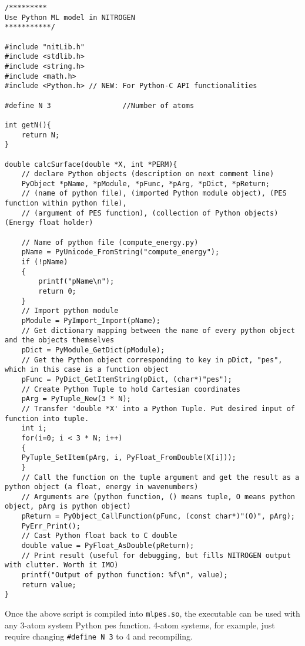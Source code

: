 \documentclass{article}
\begin{document}
\begin{lstlisting}[style=CStyle]
/*********
Use Python ML model in NITROGEN
***********/

#include "nitLib.h"
#include <stdlib.h>
#include <string.h>
#include <math.h>
#include <Python.h> // NEW: For Python-C API functionalities

#define N 3                 //Number of atoms

int getN(){
    return N;
}

double calcSurface(double *X, int *PERM){
    // declare Python objects (description on next comment line)
    PyObject *pName, *pModule, *pFunc, *pArg, *pDict, *pReturn;
    // (name of python file), (imported Python module object), (PES function within python file), 
    // (argument of PES function), (collection of Python objects) (Energy float holder)

    // Name of python file (compute_energy.py)
    pName = PyUnicode_FromString("compute_energy");         
    if (!pName)
    {
        printf("pName\n");
        return 0;
    }
    // Import python module 
    pModule = PyImport_Import(pName);                       
    // Get dictionary mapping between the name of every python object and the objects themselves 
    pDict = PyModule_GetDict(pModule);                      
    // Get the Python object corresponding to key in pDict, "pes", which in this case is a function object
    pFunc = PyDict_GetItemString(pDict, (char*)"pes");      
    // Create Python Tuple to hold Cartesian coordinates 
    pArg = PyTuple_New(3 * N);                              
    // Transfer 'double *X' into a Python Tuple. Put desired input of function into tuple.
    int i;
    for(i=0; i < 3 * N; i++)
    {
    PyTuple_SetItem(pArg, i, PyFloat_FromDouble(X[i]));
    }
    // Call the function on the tuple argument and get the result as a python object (a float, energy in wavenumbers)
    // Arguments are (python function, () means tuple, O means python object, pArg is python object)
    pReturn = PyObject_CallFunction(pFunc, (const char*)"(O)", pArg);
    PyErr_Print();
    // Cast Python float back to C double
    double value = PyFloat_AsDouble(pReturn);                   
    // Print result (useful for debugging, but fills NITROGEN output with clutter. Worth it IMO)
    printf("Output of python function: %f\n", value);           
    return value;
}
\end{lstlisting}

Once the above script is compiled into \texttt{mlpes.so}, the executable can be used with any 3-atom system Python pes function.
4-atom systems, for example, just require changing \lstinline[style=CStyle]{#define N 3} to 4 and recompiling.






\end{document}
